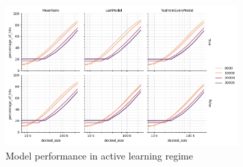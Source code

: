 
\begin{figure}[h]
\centering
\includegraphics[width=0.8\textwidth]{figures/Figure_3_D4.png}
\caption{Model performance in active learning regime}
\label{fig:fig_3}
\end{figure}


